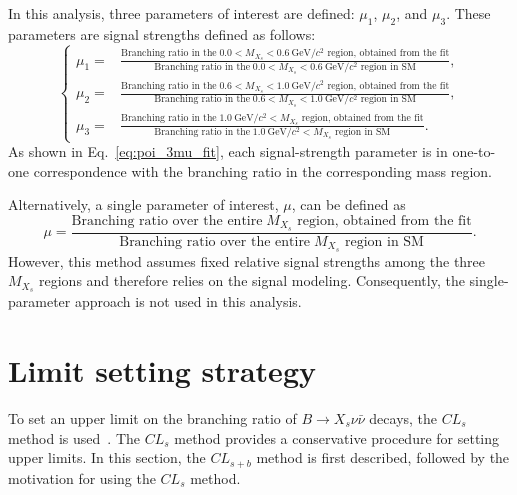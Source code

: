 In this analysis, three parameters of interest are defined: $\mu_{1}$, $\mu_{2}$, and $\mu_{3}$.
These parameters are signal strengths defined as follows:
\begin{equation}
  \label{eq:poi_3mu_fit}
  \begin{cases}
    \mu_{1} =& \frac{\textrm{Branching ratio in the} \; 0.0 < M_{X_{s}} < 0.6~\textrm{GeV}/c^{2} \textrm{ region, obtained from the fit}}{\textrm{Branching ratio in the} \; 0.0 < M_{X_{s}} < 0.6~\textrm{GeV}/c^{2} \textrm{ region in SM}}, \\[10pt]
    \mu_{2} =& \frac{\textrm{Branching ratio in the} \; 0.6 < M_{X_{s}} < 1.0~\textrm{GeV}/c^{2} \textrm{ region, obtained from the fit}}{\textrm{Branching ratio in the} \; 0.6 < M_{X_{s}} < 1.0~\textrm{GeV}/c^{2} \textrm{ region in SM}}, \\[10pt]
    \mu_{3} =& \frac{\textrm{Branching ratio in the} \; 1.0~\textrm{GeV}/c^{2} < M_{X_{s}} \textrm{ region, obtained from the fit}}{\textrm{Branching ratio in the} \; 1.0~\textrm{GeV}/c^{2} < M_{X_{s}} \textrm{ region in SM}}.
  \end{cases}
\end{equation}
As shown in Eq.~\ref{eq:poi_3mu_fit}, each signal-strength parameter is in one-to-one correspondence with the branching ratio in the corresponding mass region.

Alternatively, a single parameter of interest, $\mu$, can be defined as
\begin{equation}
  \label{eq:poi_1mu_fit}
  \mu = \frac{\textrm{Branching ratio over the entire} \; M_{X_{s}} \textrm{ region, obtained from the fit}}{\textrm{Branching ratio over the entire} \; M_{X_{s}} \textrm{ region in SM}}.
\end{equation}
However, this method assumes fixed relative signal strengths among the three $M_{X_{s}}$ regions and therefore relies on the signal modeling.
Consequently, the single-parameter approach is not used in this analysis.

\section{Limit setting strategy}
To set an upper limit on the branching ratio of $B\rightarrow X_{s}\nu \bar{\nu}$ decays, the $CL_{s}$ method is used~\cite{Read:2002hq}.
The $CL_{s}$ method provides a conservative procedure for setting upper limits.
In this section, the $CL_{s+b}$ method is first described, followed by the motivation for using the $CL_{s}$ method.

